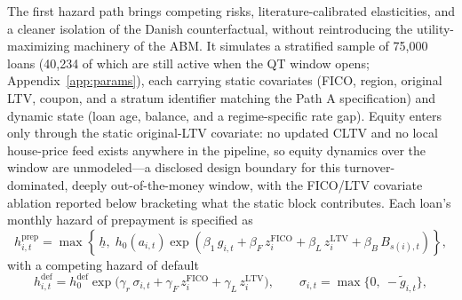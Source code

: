 \documentclass[12pt]{article}
\begin{document}
The first hazard path brings competing risks, literature-calibrated elasticities, and a cleaner isolation of the Danish counterfactual, without reintroducing the utility-maximizing machinery of the ABM. It simulates a stratified sample of 75,000 loans (40,234 of which are still active when the QT window opens; Appendix~\ref{app:params}), each carrying static covariates (FICO, region, original LTV, coupon, and a stratum identifier matching the Path A specification) and dynamic state (loan age, balance, and a regime-specific rate gap). Equity enters only through the static original-LTV covariate: no updated CLTV and no local house-price feed exists anywhere in the pipeline, so equity dynamics over the window are unmodeled---a disclosed design boundary for this turnover-dominated, deeply out-of-the-money window, with the FICO/LTV covariate ablation reported below bracketing what the static block contributes. Each loan's monthly hazard of prepayment is specified as
\begin{equation}\label{eq:pathB}
h^{\mathrm{prep}}_{i,t} = \max\!\left\{\, \underline{h},\; h_0\!\left(a_{i,t}\right) \exp\!\left( \beta_1\, g_{i,t} + \beta_F\, z^{\mathrm{FICO}}_{i} + \beta_L\, z^{\mathrm{LTV}}_{i} + \beta_B\, B_{s(i),t} \right) \right\},
\end{equation}
with a competing hazard of default
\begin{equation}\label{eq:default}
h^{\mathrm{def}}_{i,t} = h^{\mathrm{def}}_0 \exp\!\big( \gamma_r\, \sigma_{i,t} + \gamma_F\, z^{\mathrm{FICO}}_{i} + \gamma_L\, z^{\mathrm{LTV}}_{i} \big), \qquad \sigma_{i,t} = \max\{0,\ -\tilde g_{i,t}\},
\end{equation}
\end{document}

